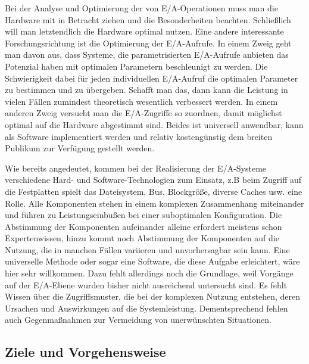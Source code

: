 



Bei der Analyse und Optimierung der von E/A-Operationen muss man die Hardware mit in Betracht ziehen und die Besonderheiten beachten.
Schließlich will man letztendlich die Hardware optimal nutzen. 
Eine andere interessante Forschungsrichtung ist die Optimierung der E/A-Aufrufe. 
In einem Zweig geht man davon aus, dass Systeme, die parametrisierten E/A-Aufrufe anbieten das Potenzial haben mit optimalen Parametern beschleunigt zu werden. 
Die Schwierigkeit dabei für jeden individuellen E/A-Aufruf die optimalen Parameter zu bestimmen und zu übergeben. 
Schafft man das, dann kann die Leistung in vielen Fällen zumindest theoretisch wesentlich verbessert werden. 
In einem anderen Zweig versucht man die E/A-Zugriffe so zuordnen, damit möglichst optimal auf die Hardware abgestimmt sind. 
Beides ist universell anwendbar, kann als Software implementiert werden und relativ kostengünstig dem breiten Publikum zur Verfügung gestellt werden.

Wie bereits angedeutet, kommen bei der Realisierung der E/A-Systeme verschiedene Hard- und Software-Technologien zum Einsatz, z.B beim Zugriff auf die Festplatten spielt das Dateisystem, Bus, Blockgröße, diverse Caches usw. eine Rolle. 
Alle Komponenten stehen in einem komplexen Zusammenhang miteinander und führen zu Leistungseinbußen bei einer suboptimalen Konfiguration. 
Die Abstimmung der Komponenten aufeinander alleine erfordert meistens schon Expertenwissen, hinzu kommt noch Abstimmung der Komponenten auf die Nutzung, die in manchen Fällen variieren und unvorhersagbar sein kann. 
Eine universelle Methode oder sogar eine Software, die diese Aufgabe erleichtert, wäre hier sehr willkommen. 
Dazu fehlt allerdings noch die Grundlage, weil Vorgänge auf der E/A-Ebene wurden bisher nicht ausreichend untersucht sind. 
Es fehlt Wissen über die Zugriffsmuster, die bei der komplexen Nutzung entstehen, deren Ursachen und Auswirkungen auf die Systemleistung. 
Dementsprechend fehlen auch Gegenmaßnahmen zur Vermeidung von unerwünschten Situationen.



\subsection{Ziele und Vorgehensweise}

